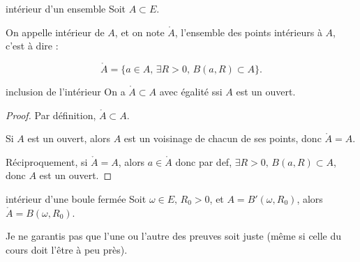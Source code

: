 \begin{definition}{intérieur d'un ensemble}{}
    Soit $A \subset E$. 

    On appelle intérieur de $A$, et on note $\mathring{A}$, l'ensemble des points intérieurs à $A$, 
    c'est à dire : 

    $$ \mathring{A} = \{a \in A, \, \exists R > 0, \, B(a, R) \subset A\}.$$
\end{definition}

\begin{proposition}{inclusion de l'intérieur}{}
    On a $\mathring{A} \subset A$ avec égalité ssi $A$ est un ouvert.
\end{proposition}

\begin{proof}
    Par définition, $\mathring{A} \subset A$.

    Si $A$ est un ouvert, alors $A$ est un voisinage de chacun de ses points, donc $\mathring{A} = A$.

    Réciproquement, si $\mathring{A} = A$, 
    alors $a \in \mathring A$ donc par def, $\exists R > 0, \, B(a, R) \subset A$, donc $A$ est un ouvert.
\end{proof}

\begin{corollaire}{intérieur d'une boule fermée}{}
    Soit $\omega \in E, \, R_0 > 0$, et $A = B'(\omega, R_0)$, alors $\mathring{A} = B(\omega, R_0)$.
\end{corollaire}

Je ne garantis pas que l'une ou l'autre des preuves soit juste (même si celle du cours 
doit l'être à peu près). 


